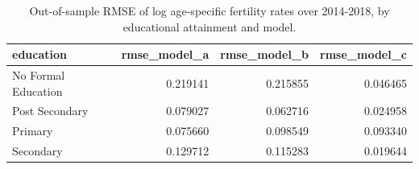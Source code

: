 \begin{table}[ht]
\centering
\begin{tabular}{lrrr}
\hline
education & rmse_model_a & rmse_model_b & rmse_model_c \\
\hline
No Formal Education & 0.219141 & 0.215855 & 0.046465 \\
Post Secondary & 0.079027 & 0.062716 & 0.024958 \\
Primary & 0.075660 & 0.098549 & 0.093340 \\
Secondary & 0.129712 & 0.115283 & 0.019644 \\
\hline
\end{tabular}
\caption{Out-of-sample RMSE of log age-specific fertility rates over 2014-2018, by educational attainment and model.}
\label{tab:revised_table_e5}
\end{table}
